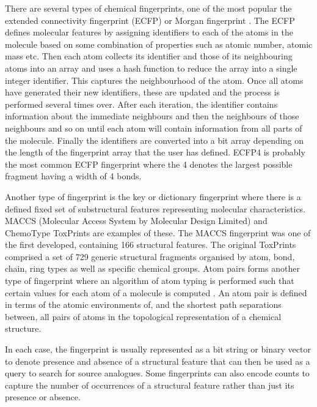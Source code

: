 \documentclass[
  super,
  preprint,
  3p]{elsarticle}
\begin{document}
There are several types of chemical fingerprints, one of the most
popular the extended connectivity fingerprint (ECFP) or Morgan
fingerprint \citep{rogers_extended-connectivity_2010}. The ECFP defines
molecular features by assigning identifiers to each of the atoms in the
molecule based on some combination of properties such as atomic number,
atomic mass etc. Then each atom collects its identifier and those of its
neighbouring atoms into an array and uses a hash function to reduce the
array into a single integer identifier. This captures the neighbourhood
of the atom. Once all atoms have generated their new identifiers, these
are updated and the process is performed several times over. After each
iteration, the identifier contains information about the immediate
neighbours and then the neighbours of those neighbours and so on until
each atom will contain information from all parts of the molecule.
Finally the identifiers are converted into a bit array depending on the
length of the fingerprint array that the user has defined. ECFP4 is
probably the most common ECFP fingerprint where the 4 denotes the
largest possible fragment having a width of 4 bonds.

Another type of fingerprint is the key or dictionary fingerprint where
there is a defined fixed set of substructural features representing
molecular characteristics. MACCS (Molecular Access System by Molecular
Design Limited) \citep{durant_reoptimization_2002} and ChemoType
ToxPrints \citep{yang_new_2015} are examples of these. The MACCS
fingerprint was one of the first developed, containing 166 structural
features. The original ToxPrints comprised a set of 729 generic
structural fragments organised by atom, bond, chain, ring types as well
as specific chemical groups. Atom pairs forms another type of
fingerprint where an algorithm of atom typing is performed such that
certain values for each atom of a molecule is computed
\citep{carhart_atom_1985}. An atom pair is defined in terms of the
atomic environments of, and the shortest path separations between, all
pairs of atoms in the topological representation of a chemical
structure.

In each case, the fingerprint is usually represented as a bit string or
binary vector to denote presence and absence of a structural feature
that can then be used as a query to search for source analogues. Some
fingerprints can also encode counts to capture the number of occurrences
of a structural feature rather than just its presence or absence.
\end{document}
